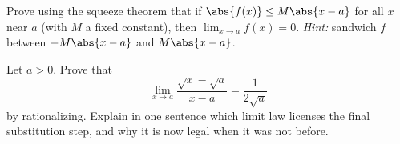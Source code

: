 \begin{exercise}
\label{ch07:exr-proof1}
Prove using the squeeze theorem that if $\abs{f(x)} \le M\abs{x-a}$ for all $x$
near $a$ (with $M$ a fixed constant), then $\displaystyle\lim_{x\to a} f(x)=0$.
\emph{Hint:} sandwich $f$ between $-M\abs{x-a}$ and $M\abs{x-a}$.
\end{exercise}

\begin{exercise}
\label{ch07:exr-proof2}
Let $a>0$. Prove that
\[
  \lim_{x\to a}\frac{\sqrt{x}-\sqrt{a}}{x-a} = \frac{1}{2\sqrt{a}}
\]
by rationalizing. Explain in one sentence which limit law licenses the final
substitution step, and why it is now legal when it was not before.
\end{exercise}

